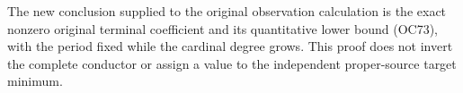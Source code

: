 The new conclusion supplied to the original observation calculation is
the exact nonzero original terminal coefficient and its quantitative
lower bound (OC73), with the period fixed while the cardinal degree grows.
This proof does not invert the complete conductor or assign a value to
the independent proper-source target minimum.
